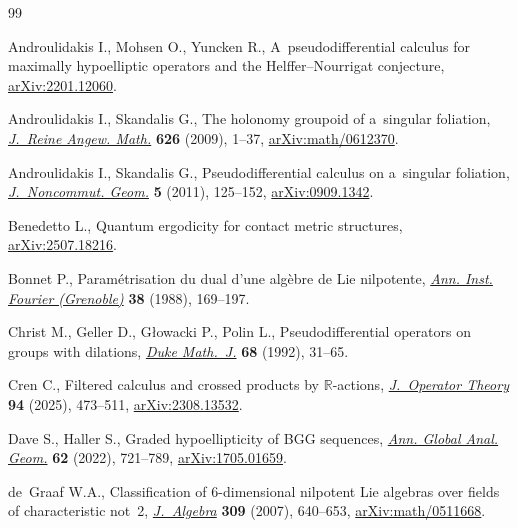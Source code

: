\documentclass[10pt,a4paper]{article}
\numberwithin{equation}{section}
\theoremstyle{definition}
\begin{document}
\begin{thebibliography}{99}
\footnotesize\itemsep=0pt

Androulidakis I., Mohsen O., Yuncken R., A~pseudodifferential calculus for
 maximally hypoelliptic operators and the {H}elffer--{N}ourrigat conjecture,
 \href{https://arxiv.org/abs/2201.12060}{arXiv:2201.12060}.

Androulidakis I., Skandalis G., The holonomy groupoid of a~singular foliation,
 \href{https://doi.org/10.1515/CRELLE.2009.001}{\textit{J.~Reine Angew.
 Math.}} \textbf{626} (2009), 1--37,
 \href{https://arxiv.org/abs/math/0612370}{arXiv:math/0612370}.

Androulidakis I., Skandalis G., Pseudodifferential calculus on a~singular
 foliation, \href{https://doi.org/10.4171/JNCG/72}{\textit{J.~Noncommut.
 Geom.}} \textbf{5} (2011), 125--152,
 \href{https://arxiv.org/abs/0909.1342}{arXiv:0909.1342}.

Benedetto L., Quantum ergodicity for contact metric structures,
 \href{https://arxiv.org/abs/2507.18216}{arXiv:2507.18216}.

Bonnet P., Param\'etrisation du dual d'une alg\`ebre de {L}ie nilpotente,
 \href{https://doi.org/10.5802/aif.1144}{\textit{Ann. Inst. Fourier
 (Grenoble)}} \textbf{38} (1988), 169--197.

Christ M., Geller D., G{\l}owacki P., Polin L., Pseudodifferential operators on
 groups with dilations,
 \href{https://doi.org/10.1215/S0012-7094-92-06802-5}{\textit{Duke Math.~J.}}
 \textbf{68} (1992), 31--65.

Cren C., Filtered calculus and crossed products by {$\mathbb R$}-actions,
 \href{https://doi.org/10.7900/jot}{\textit{J.~Operator Theory}} \textbf{94}
 (2025), 473--511, \href{https://arxiv.org/abs/2308.13532}{arXiv:2308.13532}.

Dave S., Haller S., Graded hypoellipticity of {BGG} sequences,
 \href{https://doi.org/10.1007/s10455-022-09870-0}{\textit{Ann. Global Anal.
 Geom.}} \textbf{62} (2022), 721--789,
 \href{https://arxiv.org/abs/1705.01659}{arXiv:1705.01659}.

de~Graaf W.A., Classification of 6-dimensional nilpotent {L}ie algebras over
 fields of characteristic not~2,
 \href{https://doi.org/10.1016/j.jalgebra.2006.08.006}{\textit{J.~Algebra}}
 \textbf{309} (2007), 640--653,
 \href{https://arxiv.org/abs/math/0511668}{arXiv:math/0511668}.


\end{thebibliography}
\end{document}
